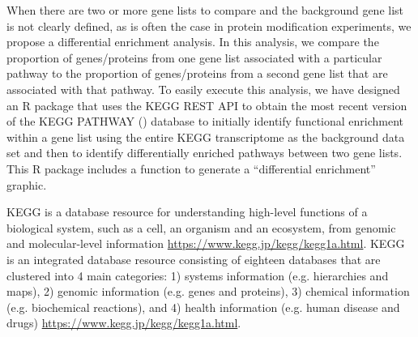 \documentclass[article]{jss}\usepackage[]{graphicx}\usepackage[]{color}
\begin{document}
When there are two or more gene lists to compare and the background gene list is
not clearly defined, as is often the case in protein modification experiments,
we propose a differential enrichment analysis. In this analysis, we compare the
proportion of genes/proteins from one gene list associated with a particular
pathway to the proportion of genes/proteins from a second gene list that are
associated with that pathway. To easily execute this analysis, we have designed
an R package that uses the KEGG REST API to obtain the most recent version of
the KEGG PATHWAY (\cite{KEGG:2000}) database to initially identify
functional enrichment within a gene list using the entire KEGG transcriptome as
the background data set and then to identify differentially enriched pathways
between two gene lists. This R package includes a function to generate a
``differential enrichment'' graphic.

KEGG is a database resource for understanding high-level functions of a
biological system, such as a cell, an organism and an ecosystem, from genomic
and molecular-level information \url{https://www.kegg.jp/kegg/kegg1a.html}. KEGG is
an integrated database resource consisting of eighteen databases that are
clustered into 4 main categories: 1) systems information (e.g. hierarchies
and maps), 2) genomic information (e.g. genes and proteins), 3) chemical
information (e.g. biochemical reactions), and 4) health information (e.g. human
disease and drugs) \url{https://www.kegg.jp/kegg/kegg1a.html}.
\end{document}
